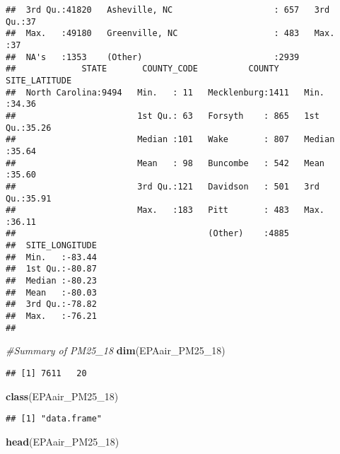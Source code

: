 \documentclass[]{article}
\newenvironment{Shaded}{\begin{snugshade}}{\end{snugshade}}
\newcommand{\KeywordTok}[1]{\textcolor[rgb]{0.13,0.29,0.53}{\textbf{#1}}}
\newcommand{\DecValTok}[1]{\textcolor[rgb]{0.00,0.00,0.81}{#1}}
\newcommand{\CommentTok}[1]{\textcolor[rgb]{0.56,0.35,0.01}{\textit{#1}}}
\newcommand{\NormalTok}[1]{#1}
\begin{document}
\begin{verbatim}
##  3rd Qu.:41820   Asheville, NC                    : 657   3rd Qu.:37  
##  Max.   :49180   Greenville, NC                   : 483   Max.   :37  
##  NA's   :1353    (Other)                          :2939               
##             STATE       COUNTY_CODE          COUNTY     SITE_LATITUDE  
##  North Carolina:9494   Min.   : 11   Mecklenburg:1411   Min.   :34.36  
##                        1st Qu.: 63   Forsyth    : 865   1st Qu.:35.26  
##                        Median :101   Wake       : 807   Median :35.64  
##                        Mean   : 98   Buncombe   : 542   Mean   :35.60  
##                        3rd Qu.:121   Davidson   : 501   3rd Qu.:35.91  
##                        Max.   :183   Pitt       : 483   Max.   :36.11  
##                                      (Other)    :4885                  
##  SITE_LONGITUDE  
##  Min.   :-83.44  
##  1st Qu.:-80.87  
##  Median :-80.23  
##  Mean   :-80.03  
##  3rd Qu.:-78.82  
##  Max.   :-76.21  
## 
\end{verbatim}

\begin{Shaded}
\begin{Highlighting}[]
\CommentTok{#Summary of PM25_18}
\KeywordTok{dim}\NormalTok{(EPAair_PM25_}\DecValTok{18}\NormalTok{)}
\end{Highlighting}
\end{Shaded}

\begin{verbatim}
## [1] 7611   20
\end{verbatim}

\begin{Shaded}
\begin{Highlighting}[]
\KeywordTok{class}\NormalTok{(EPAair_PM25_}\DecValTok{18}\NormalTok{)}
\end{Highlighting}
\end{Shaded}

\begin{verbatim}
## [1] "data.frame"
\end{verbatim}

\begin{Shaded}
\begin{Highlighting}[]
\KeywordTok{head}\NormalTok{(EPAair_PM25_}\DecValTok{18}\NormalTok{)}
\end{Highlighting}
\end{Shaded}
\end{document}
